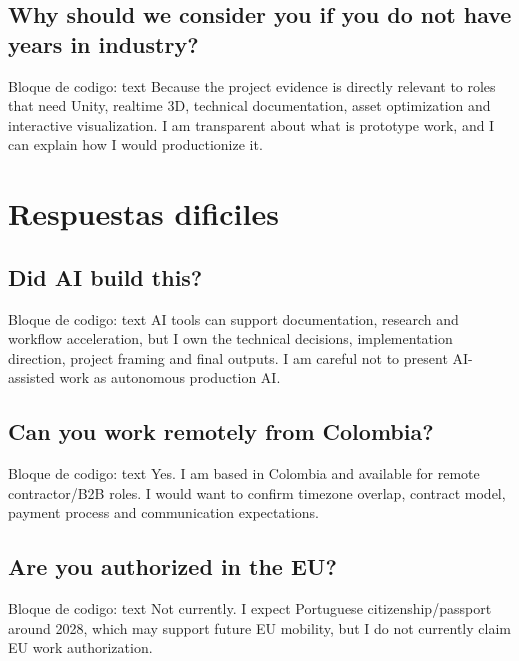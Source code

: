 \subsection{Why should we consider you if you do not have years in industry?}


\begin{mdcode}
Bloque de codigo: text
Because the project evidence is directly relevant to roles that need Unity, realtime 3D, technical documentation, asset optimization and interactive visualization. I am transparent about what is prototype work, and I can explain how I would productionize it.
\end{mdcode}


\section{Respuestas dificiles}


\subsection{Did AI build this?}


\begin{mdcode}
Bloque de codigo: text
AI tools can support documentation, research and workflow acceleration, but I own the technical decisions, implementation direction, project framing and final outputs. I am careful not to present AI-assisted work as autonomous production AI.
\end{mdcode}


\subsection{Can you work remotely from Colombia?}


\begin{mdcode}
Bloque de codigo: text
Yes. I am based in Colombia and available for remote contractor/B2B roles. I would want to confirm timezone overlap, contract model, payment process and communication expectations.
\end{mdcode}


\subsection{Are you authorized in the EU?}


\begin{mdcode}
Bloque de codigo: text
Not currently. I expect Portuguese citizenship/passport around 2028, which may support future EU mobility, but I do not currently claim EU work authorization.
\end{mdcode}


